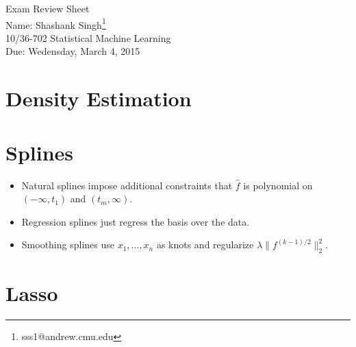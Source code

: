 \documentclass[11pt]{article}
\makeatletter
\newcommand{\myname}{Shashank Singh\footnote{sss1@andrew.cmu.edu}}
\newcommand{\myclass}{10/36-702 Statistical Machine Learning}
\newcommand{\duedate}{Wedensday, March 4, 2015}
\makeatother
\begin{document}
\thispagestyle{plain}

{\Large Exam Review Sheet} \\
Name: \myname \\
\myclass \\
Due: \duedate

\section{Density Estimation}

\section{Splines}
\begin{itemize}
\item Natural splines impose additional constraints that $\hat f$ is polynomial
on $(-\infty,t_1)$ and $(t_m,\infty)$.
\item Regression splines just regress the basis over the data.
\item Smoothing splines use $x_1,\dots,x_n$ as knots and regularize
$\lambda \|f^{(k - 1)/2}\|_2^2$.
\end{itemize}

\section{Lasso}
\end{document}
